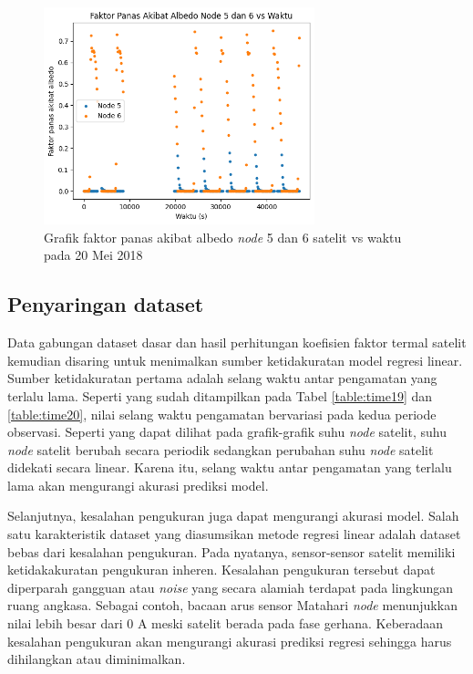\begin{figure}[H]
\setlength{}
\begin{center}
\includegraphics[width=0.7\textwidth]{fig/albedo_node56_2018-05-20.png}
	\caption{Grafik faktor panas akibat albedo \textit{node} 5 dan 6 satelit vs waktu pada 20 Mei 2018}
\label{fig:albedo5620}
\end{center}
\end{figure}

\subsection{Penyaringan dataset}

Data gabungan dataset dasar dan hasil perhitungan koefisien faktor termal
satelit kemudian disaring untuk menimalkan sumber ketidakuratan model regresi
linear. Sumber ketidakuratan pertama adalah selang waktu antar pengamatan yang
terlalu lama. Seperti yang sudah ditampilkan pada Tabel \ref{table:time19} dan
\ref{table:time20}, nilai selang waktu pengamatan bervariasi pada kedua periode
observasi. Seperti yang dapat dilihat pada grafik-grafik suhu \textit{node} satelit, suhu \textit{node} satelit berubah secara periodik sedangkan perubahan suhu \textit{node} satelit didekati secara linear. Karena itu, selang waktu antar pengamatan yang terlalu lama akan mengurangi akurasi prediksi model.

Selanjutnya, kesalahan pengukuran juga dapat mengurangi akurasi model. Salah
satu karakteristik dataset yang diasumsikan metode regresi linear adalah
dataset bebas dari kesalahan pengukuran. Pada nyatanya, sensor-sensor satelit
memiliki ketidakakuratan pengukuran inheren. Kesalahan pengukuran tersebut
dapat diperparah gangguan atau \textit{noise} yang secara alamiah terdapat pada
lingkungan ruang angkasa. Sebagai contoh, bacaan arus sensor Matahari
\textit{node} menunjukkan nilai lebih besar dari 0 A meski satelit berada pada
fase gerhana. Keberadaan kesalahan pengukuran akan mengurangi akurasi prediksi
regresi sehingga harus dihilangkan atau diminimalkan.

